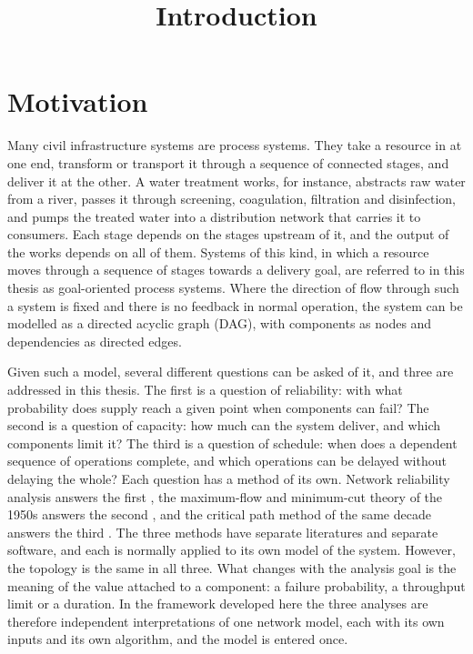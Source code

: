 \documentclass[12pt]{report}
\begin{document}
\title{Introduction}
\fi

\section{Motivation}
\label{sec:intro-motivation}

Many civil infrastructure systems are process systems. They take a resource in at one end,
transform or transport it through a sequence of connected stages, and deliver it at the
other. A water treatment works, for instance, abstracts raw water from a river,
passes it through screening, coagulation, filtration and disinfection, and pumps the treated
water into a distribution network that carries it to consumers. Each stage depends on the
stages upstream of it, and the output of the works depends on all of them. Systems of this
kind, in which a resource moves through a sequence of stages towards a delivery goal, are
referred to in this thesis as goal-oriented process systems. Where the direction of flow
through such a system is fixed and there is no feedback in normal operation, the system can be
modelled as a directed acyclic graph (DAG), with components as nodes and dependencies as
directed edges.

Given such a model, several different questions can be asked of it, and three are addressed in
this thesis. The first is a question of reliability: with what probability does supply reach a
given point when components can fail? The second is a question of capacity: how much can the
system deliver, and which components limit it? The third is a question of schedule: when does
a dependent sequence of operations complete, and which operations can be delayed without
delaying the whole? Each question has a method of its own. Network reliability analysis
answers the first \cite{billinton1992network}, the maximum-flow and minimum-cut theory of the
1950s answers the second \cite{ford1956}, and the critical path method of the same decade
answers the third \cite{kelley1959critical}. The three methods have separate literatures and
separate software, and each is normally applied to its own model of the system. However, the
topology is the same in all three. What changes with the analysis goal is the meaning of the
value attached to a component: a failure probability, a throughput limit or a duration. In the
framework developed here the three analyses are therefore independent interpretations of one network
model, each with its own inputs and its own algorithm, and the model is entered once.
\end{document}

